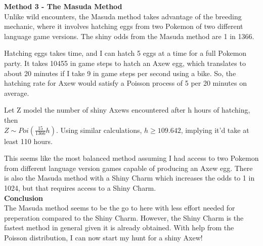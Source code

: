 \documentclass[11pt]{article}
\begin{document}
\textbf{Method 3 - The Masuda Method}
\\Unlike wild encounters, the Masuda method takes advantage of the breeding mechanic, where it involves hatching eggs from two Pokemon of two different language game versions. The shiny odds from the Masuda method are 1 in 1366.

Hatching eggs takes time, and I can hatch 5 eggs at a time for a full Pokemon party. It takes 10455 in game steps to hatch an Axew egg, which translates to about 20 minutes if I take 9 in game steps per second using a bike. So, the hatching rate for Axew would satisfy a Poisson process of 5 per 20 minutes on average.

Let Z model the number of shiny Axews encountered after h hours of hatching, then \\$Z \sim Poi (\frac{15}{1366}h)$. Using similar calculations, $h \geq 109.642$, implying it'd take at least 110 hours.

This seems like the most balanced method assuming I had access to two Pokemon from different language version games capable of producing an Axew egg. There is also the Masuda method with a Shiny Charm which increases the odds to 1 in 1024, but that requires access to a Shiny Charm.
\\

\textbf{Conclusion}
\\ The Masuda method seems to be the go to here with less effort needed for preperation compared to the Shiny Charm. However, the Shiny Charm is the fastest method in general given it is already obtained. With help from the Poisson distribution, I can now start my hunt for a shiny Axew!
\end{document}

